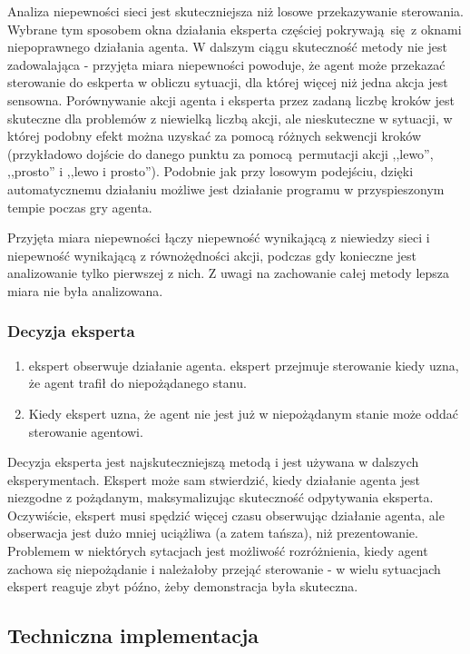 Analiza niepewności sieci jest skuteczniejsza niż losowe przekazywanie sterowania. Wybrane tym sposobem okna działania eksperta częściej pokrywają się z oknami niepoprawnego działania agenta. W dalszym ciągu skuteczność metody nie jest zadowalająca - przyjęta miara niepewności powoduje, że agent może przekazać sterowanie do eskperta w obliczu sytuacji, dla której więcej niż jedna akcja jest sensowna. Porównywanie akcji agenta i eksperta przez zadaną liczbę kroków jest skuteczne dla problemów z niewielką liczbą akcji, ale nieskuteczne w sytuacji, w której podobny efekt można uzyskać za pomocą różnych sekwencji kroków (przykładowo dojście do danego punktu za pomocą permutacji akcji ,,lewo'', ,,prosto'' i ,,lewo i prosto''). Podobnie jak przy losowym podejściu, dzięki automatycznemu działaniu możliwe jest działanie programu w przyspieszonym tempie poczas gry agenta.

Przyjęta miara niepewności łączy niepewność wynikającą z niewiedzy sieci i niepewność wynikającą z równożędności akcji, podczas gdy konieczne jest analizowanie tylko pierwszej z nich. Z uwagi na zachowanie całej metody lepsza miara nie była analizowana.

\subsubsection{Decyzja eksperta}\label{expert_call}
\begin{enumerate}
\item ekspert obserwuje działanie agenta. ekspert przejmuje sterowanie kiedy uzna, że agent trafił do niepożądanego stanu.
\item Kiedy ekspert uzna, że agent nie jest już w niepożądanym stanie może oddać sterowanie agentowi.
\end{enumerate}

Decyzja eksperta jest najskuteczniejszą metodą i jest używana w dalszych eksperymentach. Ekspert może sam stwierdzić, kiedy działanie agenta jest niezgodne z pożądanym, maksymalizując skuteczność odpytywania eksperta. Oczywiście, ekspert musi spędzić więcej czasu obserwując działanie agenta, ale obserwacja jest dużo mniej uciążliwa (a zatem tańsza), niż prezentowanie. Problemem w niektórych sytacjach jest możliwość rozróżnienia, kiedy agent zachowa się niepożądanie i należałoby przejąć sterowanie - w wielu sytuacjach ekspert reaguje zbyt późno, żeby demonstracja była skuteczna.

\subsection{Techniczna implementacja}

